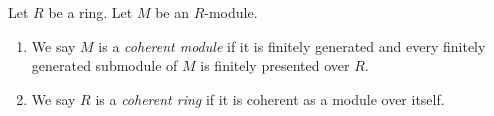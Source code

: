 \begin{definition}
\label{definition-coherent}
Let $R$ be a ring. Let $M$ be an $R$-module.
\begin{enumerate}
\item We say $M$ is a {\it coherent module} if it is finitely generated
and every finitely generated submodule of $M$ is finitely presented over
$R$.
\item We say $R$ is a {\it coherent ring} if it is coherent as a module
over itself.
\end{enumerate}
\end{definition}
